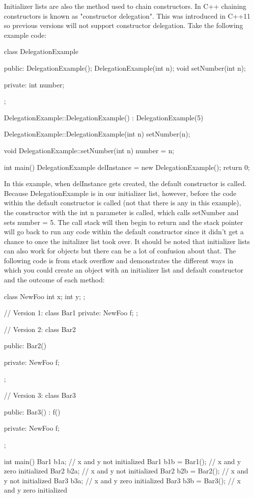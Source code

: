 \documentclass{article}
\begin{document}
Initializer lists are also the method used to chain constructors. In C++ chaining constructors is known as
"constructor delegation". This was introduced in C++11 so previous versions will not support constructor
delegation. Take the following example code:

\begin{cpplst}

class DelegationExample
{
public:
    DelegationExample();
    DelegationExample(int n);
    void setNumber(int n);

private:
    int number;
};

DelegationExample::DelegationExample()
    : DelegationExample(5)
{}

DelegationExample::DelegationExample(int n)
{
    setNumber(n);
}

void DelegationExample::setNumber(int n)
{
    number = n;
}

int main()
{
    DelegationExample delInstance = new DelegationExample();
    return 0;
}

\end{cpplst}

In this example, when delInstance gets created, the default constructor is called. Because DelegationExample
is in our initializer list, however, before the code within the default constructor is called (not that there
is any in this example), the constructor with the int n parameter is called, which calls setNumber and sets
number = 5. The call stack will then begin to return and the stack pointer will go back to run any code within
the default constructor since it didn’t get a chance to once the initalizer list took over. It should be noted
that initializer lists can also work for objects but there can be a lot of confusion about that. The following
code is from stack overflow and demonstrates the different ways in which you could create an object with an
initializer list and default constructor and the outcome of each method:

\begin{cpplst}

class NewFoo
{
    int x;
    int y;
};

// Version 1:
class Bar1
{
private:
    NewFoo f;
};

// Version 2:
class Bar2
{
 public:
     Bar2()
     {}

private:
     NewFoo f;
};

// Version 3:
class Bar3
{
public:
    Bar3() : f()
    {}

private:
    NewFoo f;
};

int main()
{
    Bar1 b1a;           // x and y not  initialized
    Bar1 b1b = Bar1();  // x and y zero initialized
    Bar2 b2a;           // x and y not  initialized
    Bar2 b2b = Bar2();  // x and y not  initialized
    Bar3 b3a;           // x and y zero initialized
    Bar3 b3b = Bar3();  // x and y zero initialized
}

\end{cpplst}
\end{document}
